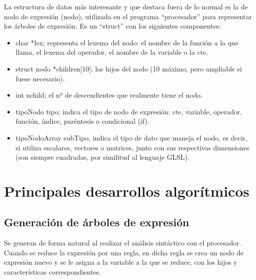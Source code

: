 La estructura de datos más interesante y que destaca fuera de lo normal es la de nodo de expresión (nodo), utilizada en el programa ``procesador'' para representar los árboles de expresión. Es un ``struct'' con los siguientes componentes:
\begin{itemize}
	\item char *lex; representa el lexema del nodo: el nombre de la función a la que llama, el lexema del operador, el nombre de la variable o la cte.
	\item struct nodo *children[10]; los hijos del nodo (10 máximo, pero ampliable si fuese necesario).
	\item int nchild; el nº de descendientes que realmente tiene el nodo.
	\item tipoNodo tipo; indica el tipo de nodo de expresión: cte, variable, operador, función, índice, paréntesis o condicional (if).
	\item tipoNodoArray subTipo, indica el tipo de dato que maneja el nodo, es decir, si utiliza escalares, vectores o matrices, junto con sus respectivas dimensiones (son siempre cuadradas, por similitud al lenguaje GLSL).
\end{itemize}

\section{Principales desarrollos algorítmicos}

\subsection*{Generación de árboles de expresión}
Se generan de forma natural al realizar el análisis sintáctico con el procesador. Cuando se reduce la expresión por una regla, en dicha regla se crea un nodo de expresión nuevo y se le asigna a la variable a la que se reduce, con los hijos y características correspondientes.

